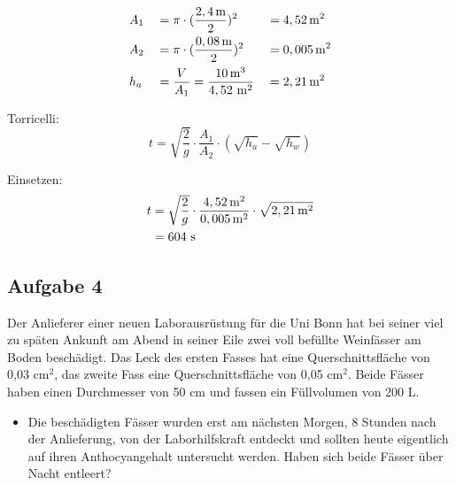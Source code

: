 \documentclass[a4paper,11pt]{article}
\begin{document}
\begin{marginfigure}[+2cm]
 


\begin{align*}
&A_1 &&= \pi \cdot (\frac{2,4\mskip3mu \text{m}}{2})^2 &&= 4,52\mskip3mu \text{m}^2 \\
&A_2 &&= \pi \cdot (\frac{0,08\mskip3mu \text{m}}{2})^2 &&= 0,005\mskip3mu \text{m}^2 \\
&h_a &&= \frac{V}{A_1} = \frac{10\mskip3mu \text{m}^3}{4,52~\text{m}^2} &&= 2,21\mskip3mu \text{m}^2 
\end{align*}

\ppbig
Torricelli:
\begin{equation}
t = \sqrt{\frac{2}{g}} \cdot \frac{A_1}{A_2} \cdot (\sqrt{h_a} - \sqrt{h_w})
\end{equation}

Einsetzen:
\begin{align*}
t &= \sqrt{\frac{2}{g}} \cdot \frac{4,52\mskip3mu \text{m}^2}{0,005\mskip3mu \text{m}^2} \cdot \sqrt{2,21\mskip3mu \text{m}^2} \\
&= 604 ~\text{s}
\end{align*}




\pagebreak
 
 
\pagebreak

\subsection*{Aufgabe 4}
Der Anlieferer einer neuen Laborausrüstung für die Uni Bonn hat bei seiner viel zu späten Ankunft am Abend in seiner Eile zwei voll befüllte Weinfässer am Boden beschädigt. Das Leck des ersten Fasses hat eine Querschnittsfläche von 0,03 cm$^2$, das zweite Fass eine Querschnittsfläche von 0,05 cm$^2$. Beide Fässer haben einen Durchmesser von 50 cm und fassen ein Füllvolumen von 200 L. \par 

\begin{marginfigure}[0cm]
\centering
{}
\end{marginfigure}
 
\vspace*{0mm}
 
  
\begin{itemize}
\item Die beschädigten Fässer wurden erst am nächsten Morgen, 8 Stunden nach der Anlieferung, von der Laborhilfskraft entdeckt und sollten heute eigentlich auf ihren Anthocyangehalt untersucht werden. Haben sich beide Fässer über Nacht entleert?
 


\end{itemize}
\end{marginfigure}
\end{document}
